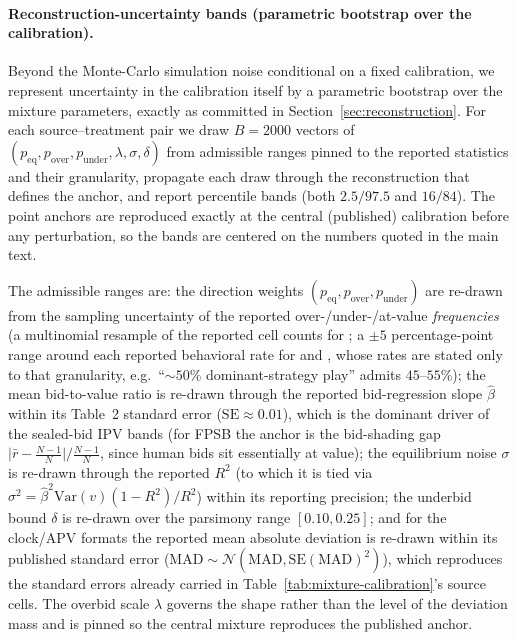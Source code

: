 
\paragraph{Reconstruction-uncertainty bands (parametric bootstrap over the
calibration).}
Beyond the Monte-Carlo simulation noise conditional on a fixed calibration, we
represent uncertainty in the calibration itself by a parametric bootstrap over
the mixture parameters, exactly as committed in Section~\ref{sec:reconstruction}.
For each source--treatment pair we draw $B=2000$ vectors of
$(p_{\text{eq}}, p_{\text{over}}, p_{\text{under}}, \lambda, \sigma, \delta)$
from admissible ranges pinned to the reported statistics and their granularity,
propagate each draw through the reconstruction that defines the anchor, and
report percentile bands (both $2.5/97.5$ and $16/84$). The point anchors are
reproduced exactly at the central (published) calibration before any
perturbation, so the bands are centered on the numbers quoted in the main text.

The admissible ranges are: the direction weights
$(p_{\text{eq}}, p_{\text{over}}, p_{\text{under}})$ are re-drawn from the
sampling uncertainty of the reported over-/under-/at-value \emph{frequencies}
(a multinomial resample of the reported cell counts for
\citet{kagel1993independent}; a $\pm 5$ percentage-point range around each
reported behavioral rate for \citet{li2017obviously} and
\citet{breitmoser2022obviousness}, whose rates are stated only to that
granularity, e.g.\ ``${\sim}50\%$ dominant-strategy play'' admits $45$--$55\%$);
the mean bid-to-value ratio is re-drawn through the reported bid-regression slope
$\hat\beta$ within its Table~2 standard error ($\mathrm{SE}\approx 0.01$), which
is the dominant driver of the sealed-bid IPV bands (for FPSB the anchor is the
bid-shading gap $\lvert \bar r - \tfrac{N-1}{N}\rvert/\tfrac{N-1}{N}$, since human
bids sit essentially at value); the equilibrium noise $\sigma$ is re-drawn
through the reported $R^{2}$ (to which it is tied via
$\sigma^{2}=\hat\beta^{2}\mathrm{Var}(v)(1-R^{2})/R^{2}$) within its reporting
precision; the underbid bound $\delta$ is re-drawn over the parsimony range
$[0.10, 0.25]$; and for the clock/APV formats the reported mean absolute
deviation is re-drawn within its published standard error
($\mathrm{MAD}\sim\mathcal N(\mathrm{MAD}, \mathrm{SE}(\mathrm{MAD})^{2})$), which
reproduces the standard errors already carried in
Table~\ref{tab:mixture-calibration}'s source cells. The overbid scale $\lambda$
governs the shape rather than the level of the deviation mass and is pinned so
the central mixture reproduces the published anchor.

